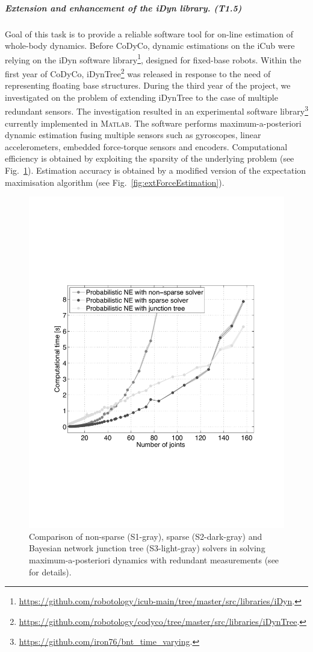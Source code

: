 
\subparagraph{Extension and enhancement of the iDyn library. (T1.5)} \label{sec:T15}

Goal of this task is to provide a reliable software tool for on-line
estimation of whole-body dynamics.  Before CoDyCo, dynamic estimations on the
iCub were relying on the iDyn software
library\footnote{\url{https://github.com/robotology/icub-main/tree/master/src/libraries/iDyn}.},
designed for fixed-base robots.  Within the first year of CoDyCo,
iDynTree\footnote{{\url{https://github.com/robotology/codyco/tree/master/src/libraries/iDynTree}}.}
was released in response to the need of representing floating base structures.
During the third year of the project, we investigated on the problem of
extending iDynTree to the case of multiple redundant sensors.  The
investigation resulted in an experimental software
library\footnote{\url{https://github.com/iron76/bnt_time_varying}.} currently
implemented in \textsc{Matlab}.  The software performs maximum-a-posteriori
dynamic estimation fusing multiple sensors such as gyroscopes, linear
accelerometers, embedded force-torque sensors and encoders.  Computational
efficiency is obtained by exploiting the sparsity of the underlying
problem \cite{Nori2015} (see Fig.~\ref{fig:varTimeComplete}).  Estimation
accuracy is obtained by a modified version of the expectation maximisation
algorithm \cite{Nori2015b} (see Fig.~\ref{fig:extForceEstimation}).

\begin{figure}
   \centering
   \includegraphics[height=0.35\hsize]{images/varTimeComplete.pdf}
   \caption{\label{fig:varTimeComplete} Comparison of non-sparse (S1-gray),
   sparse (S2-dark-gray) and Bayesian network junction tree (S3-light-gray)
   solvers in solving maximum-a-posteriori dynamics with redundant
   measurements (see \cite{Nori2015} for details).}
\end{figure}

